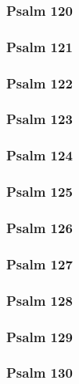 \documentclass[12pt]{extarticle}
\begin{document}
\begin{multicols}{2}
\subsubsection{Psalm 120}

\newpage

\subsubsection{Psalm 121}

\newpage

\subsubsection{Psalm 122}

\newpage

\subsubsection{Psalm 123}

\newpage

\subsubsection{Psalm 124}

\newpage

\subsubsection{Psalm 125}

\newpage

\subsubsection{Psalm 126}

\newpage

\subsubsection{Psalm 127}

\newpage

\subsubsection{Psalm 128}

\newpage

\subsubsection{Psalm 129}

\newpage

\subsubsection{Psalm 130}

\newpage


\end{multicols}
\end{document}
